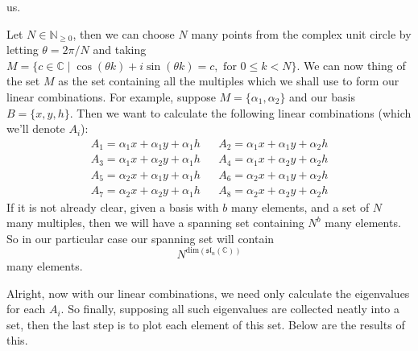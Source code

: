 \documentclass[12pt]{article}
\theoremstyle{definition}
\theoremstyle{definition}
\begin{document}
        us.\par\hspace{4mm} Let $N\in\mathbb{N}_{\geq 0}$, then we can choose $N$ 
        many points from the complex unit circle by letting $\theta
        = 2\pi/N$ and taking $M=\{c\in\mathbb{C}\mid \cos(\theta
        k)+i\sin(\theta k)=c, \text{ for }0\leq k<N\}$. We can now thing of the set 
        $M$ as the set containing all the multiples which we shall use to form our 
        linear combinations. For example, suppose $M=\{\alpha_1, \alpha_2\}$ and 
        our basis $B=\{x, y, h\}$. Then we want to calculate the following linear 
        combinations (which we'll denote $A_i$):
        \begin{align*}
            &A_{1}=\alpha_1x+\alpha_1y+\alpha_1h& 
            &A_{2}=\alpha_1x+\alpha_1y+\alpha_2h& \\ 
            &A_{3}=\alpha_1x+\alpha_2y+\alpha_1h& 
            &A_{4}=\alpha_1x+\alpha_2y+\alpha_2h& \\ 
            &A_5=\alpha_2x+\alpha_1y+\alpha_1h&   
            &A_6=\alpha_2x+\alpha_1y+\alpha_2h& \\
            &A_7=\alpha_2x+\alpha_2y+\alpha_1h&   &A_8=\alpha_2x+\alpha_2y+\alpha_2h&
        \end{align*}
        If it is not already clear, given a basis with $b$ many elements, and a 
        set of $N$ many multiples, then we will have a spanning set containing 
        $N^b$ many elements. So in our particular case our spanning set will contain
        \begin{equation*}
            N^{\text{dim}(\mathfrak{sl}_n(\mathbb{C}))}
        \end{equation*}
        many elements.\par\hspace{4mm} Alright, now with our linear combinations, 
        we need only calculate the eigenvalues for each $A_i$. So finally, supposing 
        all such eigenvalues are collected neatly into a set, then the last step is 
        to plot each element of this set. Below are the results of this.\newpage
        
\end{document}
